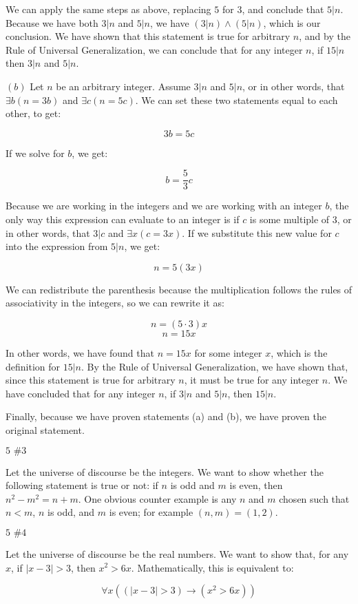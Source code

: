 \documentclass{article}
\newcommand{\problem}[2]{$\boxed{\text{#1 \##2}}$}
\newcommand{\subproblem}[1]{$\boxed{(#1)}$}
\newcommand{\RUG}{Rule of Universal Generalization}
\begin{document}
\begin{multicols*}{2}
We can apply the same steps as above, replacing $5$ for $3$, and
conclude that $5|n$. Because we have both $3|n$ and $5|n$, we have
$(3|n)\wedge(5|n)$, which is our conclusion. We have shown that this
statement is true for arbitrary $n$, and by the \RUG, we can conclude
that for any integer $n$, if $15|n$ then $3|n$ and $5|n$.

\subproblem{b} Let $n$ be an arbitrary integer. Assume $3|n$ and
$5|n$, or in other words, that $\exists{}b(n=3b)$ and
$\exists{}c(n=5c)$. We can set these two statements equal to each
other, to get:

\[
3b=5c
\]

If we solve for $b$, we get:

\[
b=\frac{5}{3}c
\]

Because we are working in the integers and we are working with an
integer $b$, the only way this expression can evaluate to an integer
is if $c$ is some multiple of $3$, or in other words, that $3|c$ and
$\exists{}x(c=3x)$. If we substitute this new value for $c$ into the
expression from $5|n$, we get:

\[
n=5(3x)
\]

We can redistribute the parenthesis because the multiplication follows
the rules of associativity in the integers, so we can rewrite it as:

\[
n=(5\cdot 3)x
\] \[
n=15x
\]

In other words, we have found that $n=15x$ for some integer $x$, which
is the definition for $15|n$. By the \RUG, we have shown that, since
this statement is true for arbitrary $n$, it must be true for any
integer $n$. We have concluded that for any integer $n$, if $3|n$ and
$5|n$, then $15|n$.

Finally, because we have proven statements (a) and (b), we have proven
the original statement.

\problem{5}{3}

Let the universe of discourse be the integers. We want to show whether
the following statement is true or not: if $n$ is odd and $m$ is even,
then $n^2-m^2=n+m$. One obvious counter example is any $n$ and $m$
chosen such that $n<m$, $n$ is odd, and $m$ is even; for example
$(n,m)=(1,2)$.

\problem{5}{4}

Let the universe of discourse be the real numbers. We want to show
that, for any $x$, if $|x-3|>3$, then $x^2>6x$. Mathematically, this
is equivalent to:

\[
\forall x((|x-3|>3)\rightarrow(x^2>6x))
\]


\end{multicols*}
\end{document}
